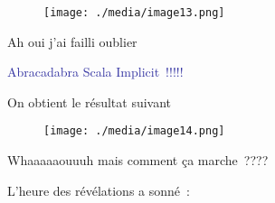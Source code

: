 \documentclass[12pt]{article}
\begin{document}

\begin{figure}[H]
	\begin{Center}
		\texttt{[image: ./media/image13.png]}
	\end{Center}
\end{figure}



\par

Ah oui j’ai failli oublier\par

\begin{Center}
{\fontsize{28pt}{33.6pt}\selectfont \textcolor[HTML]{3030A0}{Abracadabra Scala Implicit !!!!!}\par}
\end{Center}\par

On obtient le résultat suivant\par




\begin{figure}[H]
	\begin{Center}
		\texttt{[image: ./media/image14.png]}
	\end{Center}
\end{figure}



\par


\vspace{\baselineskip}
Whaaaaaouuuh mais comment ça marche ????\par


\vspace{\baselineskip}

\vspace{\baselineskip}

\vspace{\baselineskip}
 L’heure des révélations a sonné : \par


\vspace{\baselineskip}


\end{document}
